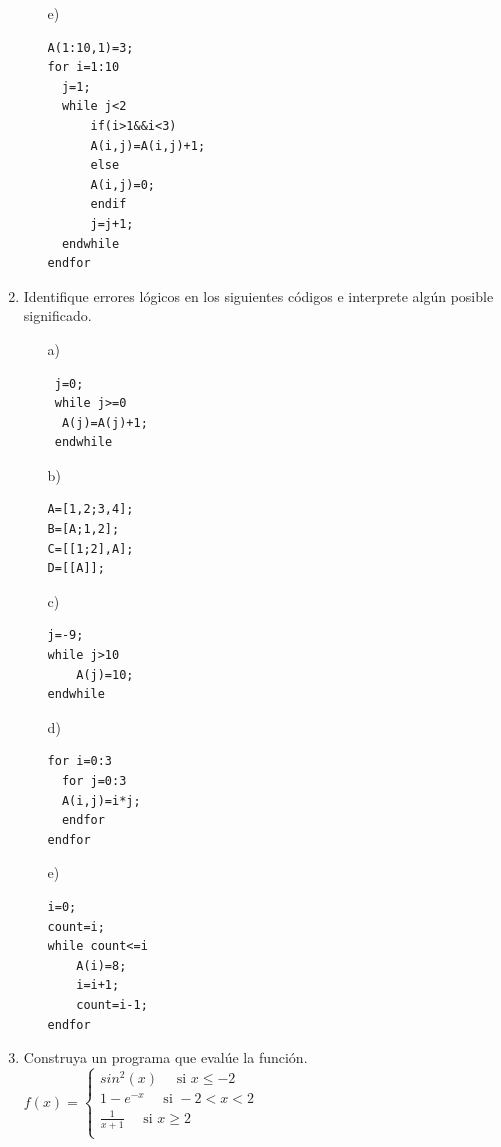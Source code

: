 \documentclass[letter,11pt]{article}
\newcommand\0{\mathbf{0}}
\begin{document}
\begin{enumerate}
\begin{multicols}{2}
\begin{itemize}
   \item[e)] 
\begin{lstlisting}
A(1:10,1)=3;
for i=1:10
  j=1;
  while j<2
      if(i>1&&i<3)
      A(i,j)=A(i,j)+1;
      else
      A(i,j)=0;
      endif
      j=j+1;
  endwhile
endfor
\end{lstlisting}

    \end{itemize}
	\end{multicols}
    
    \item Identifique errores l\'ogicos en los siguientes c\'odigos e interprete alg\'un posible significado.
    
    \begin{multicols}{2} 
      \begin{itemize}
       \item[a)]
\begin{lstlisting}
 j=0;
 while j>=0
  A(j)=A(j)+1;
 endwhile
\end{lstlisting}

       \item[b)]
\begin{lstlisting}
A=[1,2;3,4];
B=[A;1,2];
C=[[1;2],A];
D=[[A]];
\end{lstlisting}

       \item[c)]
\begin{lstlisting}
j=-9;
while j>10
    A(j)=10;
endwhile
\end{lstlisting}


       \item[d)]
\begin{lstlisting}
for i=0:3
  for j=0:3
  A(i,j)=i*j;
  endfor
endfor
\end{lstlisting}

       \item[e)]
\begin{lstlisting}
i=0;
count=i;
while count<=i
    A(i)=8;
    i=i+1;
    count=i-1;
endfor
\end{lstlisting}
\end{itemize}
    \end{multicols}


  \item Construya un programa que eval\'ue la funci\'on. 
  $f(x)=\begin{cases}																					sin^2(x)\quad \text{ si } x\leq -2\\														1-e^{-x}\quad \text{ si } -2 < x< 2\\														\frac{1}{x+1} \quad \text{ si }  x\geq 2\\												\end{cases}$
  

\end{enumerate}
\end{document}
